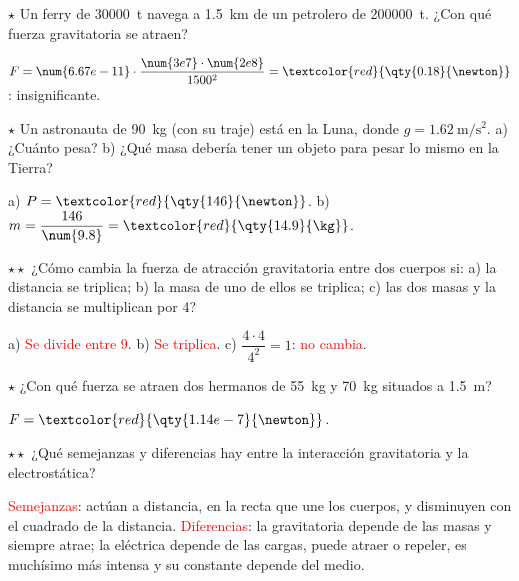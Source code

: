 \begin{exercise}
    \(\star\) Un ferry de \qty{30000}{t} navega a \qty{1.5}{\km} de un petrolero de \qty{200000}{t}. ¿Con qué fuerza gravitatoria se
    atraen?
    \begin{solu}
        \(F = \num{6.67e-11} \cdot \dfrac{\num{3e7} \cdot \num{2e8}}{1500^2} = \textcolor{red}{\qty{0.18}{\newton}}\): insignificante.
    \end{solu}
\end{exercise}

\begin{exercise}
    \(\star\) Un astronauta de \qty{90}{\kg} (con su traje) está en la Luna, donde \(g = \qty{1.62}{\m\per\s\squared}\). a) ¿Cuánto pesa?
    b) ¿Qué masa debería tener un objeto para pesar lo mismo en la Tierra?
    \begin{solu}
        a) \(P = \textcolor{red}{\qty{146}{\newton}}\). b) \(m = \dfrac{146}{\num{9.8}} = \textcolor{red}{\qty{14.9}{\kg}}\).
    \end{solu}
\end{exercise}

\begin{exercise}
    \(\star\star\) ¿Cómo cambia la fuerza de atracción gravitatoria entre dos cuerpos si: a) la distancia se triplica; b) la masa de uno de
    ellos se triplica; c) las dos masas y la distancia se multiplican por 4?
    \begin{solu}
        a) \textcolor{red}{Se divide entre 9}. b) \textcolor{red}{Se triplica}. c) \(\dfrac{4 \cdot 4}{4^2} = 1\): \textcolor{red}{no cambia}.
    \end{solu}
\end{exercise}

\begin{exercise}
    \(\star\) ¿Con qué fuerza se atraen dos hermanos de \qty{55}{\kg} y \qty{70}{\kg} situados a \qty{1.5}{\m}?
    \begin{solu}
        \(F = \textcolor{red}{\qty{1.14e-7}{\newton}}\).
    \end{solu}
\end{exercise}

\begin{exercise}
    \(\star\star\) ¿Qué semejanzas y diferencias hay entre la interacción gravitatoria y la electrostática?
    \begin{solu}
        \textcolor{red}{Semejanzas}: actúan a distancia, en la recta que une los cuerpos, y disminuyen con el cuadrado de la distancia.
        \textcolor{red}{Diferencias}: la gravitatoria depende de las masas y siempre atrae; la eléctrica depende de las cargas, puede
        atraer o repeler, es muchísimo más intensa y su constante depende del medio.
    \end{solu}
\end{exercise}

